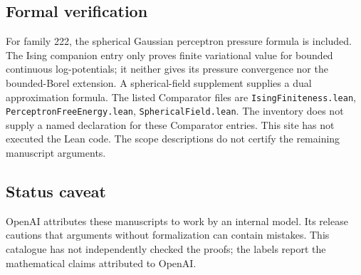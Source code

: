\documentclass[11pt]{article}
\begin{document}
\subsection{Formal verification}
For family 222, the spherical Gaussian perceptron pressure formula is included. The Ising companion entry only proves finite variational value for bounded continuous log-potentials; it neither gives its pressure convergence nor the bounded-Borel extension. A spherical-field supplement supplies a dual approximation formula. The listed Comparator files are \texttt{IsingFiniteness.lean}, \texttt{PerceptronFreeEnergy.lean}, \texttt{SphericalField.lean}. The inventory does not supply a named declaration for these Comparator entries. This site has not executed the Lean code. The scope descriptions do not certify the remaining manuscript arguments.

\subsection{Status caveat}
OpenAI attributes these manuscripts to work by an internal model. Its release cautions that arguments without formalization can contain mistakes. This catalogue has not independently checked the proofs; the labels report the mathematical claims attributed to OpenAI.
\end{document}
